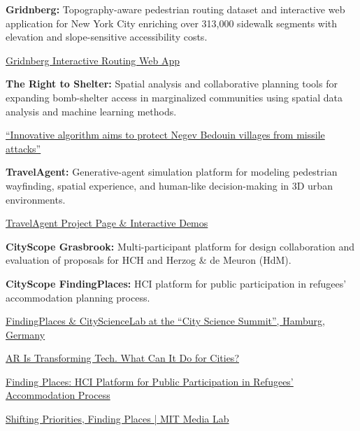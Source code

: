 \begin{tablist}
    \item[2026] \tab \textbf{Gridnberg:} {Topography-aware pedestrian routing dataset and interactive web application for New York City enriching over 313,000 sidewalk segments with elevation and slope-sensitive accessibility costs.}
    \begin{tablist}
        \item[2026] \tab \href{https://relno.github.io/gridnberg/}{Gridnberg Interactive Routing Web App}
    \end{tablist}

    \item[2024--2026] \tab \textbf{The Right to Shelter:} {Spatial analysis and collaborative planning tools for expanding bomb-shelter access in marginalized communities using spatial data analysis and machine learning methods.}
    \begin{tablist}
        \item[2025] \tab \href{https://www.ynetnews.com/real-estate/article/s1zbwjtyxx}{\enquote{Innovative algorithm aims to protect Negev Bedouin villages from missile attacks}}
    \end{tablist}

    \item[2024--2025] \tab \textbf{TravelAgent:} {Generative-agent simulation platform for modeling pedestrian wayfinding, spatial experience, and human-like decision-making in 3D urban environments.}
    \begin{tablist}
        \item[2025] \tab \href{https://relno.github.io/travelAgent/}{TravelAgent Project Page \& Interactive Demos}
    \end{tablist}

    \item[2018--2021] \tab \textbf{CityScope Grasbrook:} {Multi-participant platform for design collaboration and evaluation of proposals for HCH and Herzog \& de Meuron (HdM).}

    \item[2015--2016] \tab \textbf{CityScope FindingPlaces:} {HCI platform for public participation in refugees' accommodation planning process.}
    \begin{tablist}
        \item[2019] \tab \href{https://www.youtube.com/watch?v=PZg6A_A65lQ}{FindingPlaces \& CityScienceLab at the \enquote{City Science Summit}, Hamburg, Germany}
        \item[2018] \tab \href{https://datasmart.ash.harvard.edu/news/article/ar-transforming-tech-what-can-it-do-cities}{AR Is Transforming Tech. What Can It Do for Cities?}
        \item[2017] \tab \href{https://www.media.mit.edu/publications/finding-places/}{Finding Places: HCI Platform for Public Participation in Refugees' Accommodation Process}
        \item[2016] \tab \href{https://medium.com/mit-media-lab/shifting-priorities-finding-places-9ad3bdbe38b8}{Shifting Priorities, Finding Places | MIT Media Lab}
    \end{tablist}


\end{tablist}
